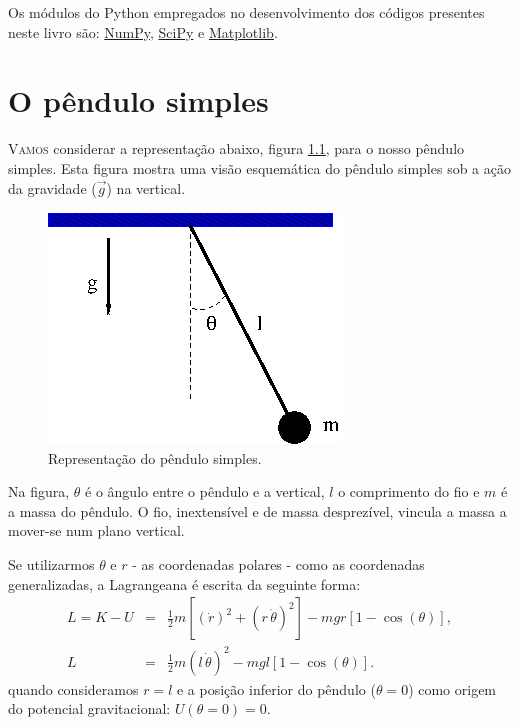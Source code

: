 \documentclass[12pt,openright,twoside,english,brazil]{abntex2}
\begin{document}
Os módulos do Python empregados no desenvolvimento dos códigos presentes neste livro são: \href{hhtps://numpy.org}{NumPy}, \href{hhtps://scipy.org}{SciPy} e \href{https://matplotlib.org}{Matplotlib}.

\chapter[O pêndulo simples]{O pêndulo simples}
\lettrine[nindent=0.35em,lhang=0.40,loversize=0.3]{V}{amos} considerar a representação abaixo, figura \ref{Figura1}, para o nosso pêndulo simples. Esta figura mostra uma visão esquemática do pêndulo simples sob a ação da gravidade ($\vec{g}$) na vertical.  

\begin{figure}[h]
\begin{center}
 \includegraphics[scale=0.5]{pendulo.png}
\end{center}
\caption{Representação do pêndulo simples.}
\label{Figura1}
\end{figure}

Na figura, $\theta$ é o ângulo entre o pêndulo e a vertical, $l$ o  comprimento do fio e $m$ é a massa do pêndulo. O fio, inextensível e de massa desprezível, vincula a massa a mover-se num plano vertical.

Se utilizarmos $\theta$ e $r$ - as coordenadas polares - como as coordenadas generalizadas, a Lagrangeana é escrita da seguinte forma:
\begin{eqnarray}
L = K - U & = & \frac{1}{2}m \left[ (\dot{r})^2 + (r\, \dot{\theta})^2 \right] - mgr[1-\cos{(\theta)}], \nonumber \\
L & = & \frac{1}{2} m(l\, \dot{\theta})^2 - mgl [1 - \cos{(\theta)} ].
 \label{equa1}
\end{eqnarray}
quando consideramos $r=l$ e a posição inferior do pêndulo ($\theta=0$) como origem do potencial gravitacional: $U(\theta=0)=0$.
\end{document}
